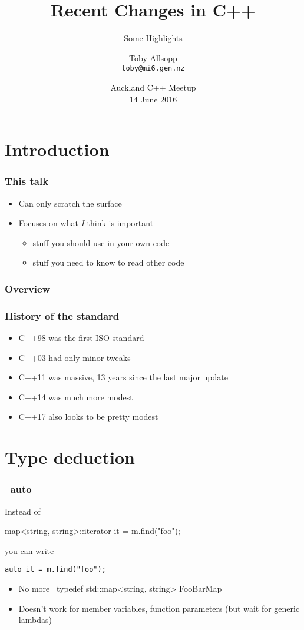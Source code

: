 \documentclass[aspectratio=1610]{beamer}
\date{Auckland C++ Meetup\\14 June 2016}
\title{Recent Changes in C++}
\subtitle{Some Highlights}
\author[Toby Allsopp]{Toby Allsopp\\\texttt{toby@mi6.gen.nz}}
\begin{document}

\frame{\titlepage}

\section{Introduction}

\begin{frame}
  \frametitle{This talk}
  \begin{itemize}
  \item Can only scratch the surface
  \item Focuses on what \emph{I} think is important
    \begin{itemize}
    \item stuff you should use in your own code
    \item stuff you need to know to read other code
    \end{itemize}
  \end{itemize}
\end{frame}

\begin{frame}
  \frametitle{Overview}
  \tableofcontents
\end{frame}

\begin{frame}
  \frametitle{History of the standard}
  \begin{itemize}
  \item C++98 was the first ISO standard
  \item C++03 had only minor tweaks
  \item C++11 was massive, 13 years since the last major update
  \item C++14 was much more modest
  \item C++17 also looks to be pretty modest
  \end{itemize}
\end{frame}

\section{Type deduction}

\begin{frame}[fragile]
  \frametitle{\cpp~auto~}
  Instead of
  \begin{cppcode}
    map<string, string>::iterator it = m.find("foo");
  \end{cppcode}
  you can write
\begin{verbatim}
auto it = m.find("foo");
\end{verbatim}
  \begin{itemize}
  \item No more \cpp~typedef std::map<string, string> FooBarMap~
  \item Doesn't work for member variables, function parameters (but wait for
    generic lambdas)
  \end{itemize}
\end{frame}
\end{document}
